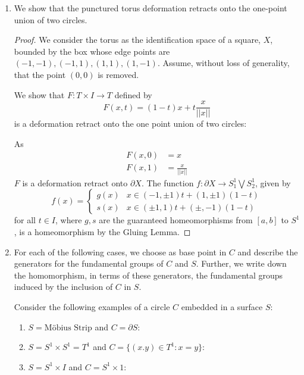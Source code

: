 \documentclass{book}
\begin{document}
\begin{enumerate}[(1)]
    \item We show that the punctured torus deformation retracts onto the one-point union of two circles. 
        \begin{proof} We consider the torus as the identification space of a square, $X$, bounded by the box whose edge points are $(-1,-1),(-1,1),(1,1),(1,-1)$. Assume, without loss of generality, that the point $(0,0)$ is removed. 
            \par We show that $F:T \times I \rightarrow T$ defined by 
            $$F(x,t) = (1-t)x + t\frac{x}{||x||}$$
            is a deformation retract onto the one point union of two circles: 
            \par As
            \begin{align*}
                F(x,0) & = x \\
                F(x,1) & = \frac{x}{||x||} 
            \end{align*}
            $F$ is a deformation retract onto $\partial X$. The function $f: \partial X \rightarrow S_1^1 \bigvee S_2^1$, given by 
            \[f(x) = 
            \begin{cases}
                g(x) & x \in (-1,\pm1)t + (1,\pm1)(1-t) \\
                s(x) & x \in (\pm1,1)t + (\pm,-1)(1-t)
            \end{cases}
            \]
            for all $t \in I$, where $g,s$ are the guaranteed homeomorphisms from $[a,b]$ to $S^1$, is a homeomorphism by the Gluing Lemma. 
        \end{proof}

    \item For each of the following cases, we choose as base point in $C$ and describe the generators for the fundamental groups of $C$ and $S$. Further, we write down the homomorphism, in terms of these generators, the fundamental groups induced by the inclusion of $C$ in $S$. 
        \par Consider the following examples of a circle $C$ embedded in a surface $S$: 
        \begin{enumerate}
            \item $S = \text{M{\"o}bius Strip}$ and $C = \partial S$: 
            \item $S = S^1 \times S^1 = T^1$ and $C = \{(x.y) \in T^1 : x = y\}$:
            \item $S = S^1 \times I$ and $C = S^1 \times 1$:
        \end{enumerate}


\end{enumerate}
\end{document}
